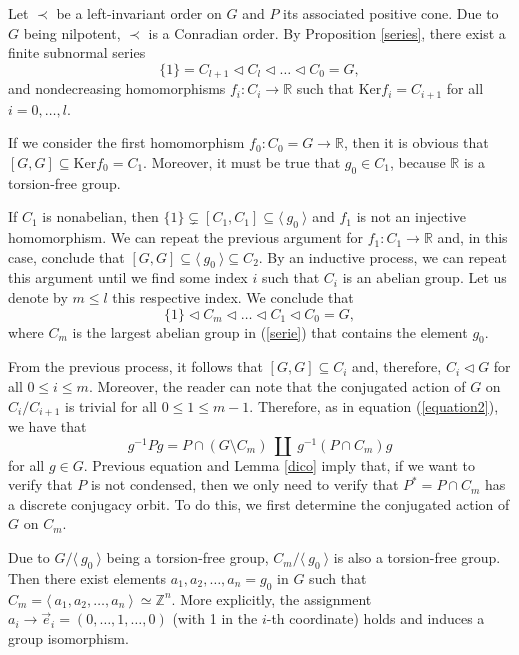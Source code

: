 \documentclass[12pt]{article}
\theoremstyle{definition}
\begin{document}
Let $\prec$ be a left-invariant order on $G$ and $P$ its associated positive cone. Due to $G$ being nilpotent, $\prec$ is a Conradian order. By Proposition \ref{series}, there exist a finite subnormal series
        \begin{equation}
        \label{serie}
        \{1\}=C_{l+1}\vartriangleleft C_l\vartriangleleft \dots \vartriangleleft C_0=G,    
        \end{equation}
and nondecreasing homomorphisms $f_i:C_i\rightarrow \mathbb{R}$ such that Ker$f_i=C_{i+1}$ for all $i=0,\dots,l$. 

If we consider the first homomorphism $f_0:C_0=G\rightarrow \mathbb{R}$, then it is obvious that $[G,G]\subseteq \text{Ker}f_0=C_1$. 
        Moreover, it must be true that $g_0\in C_1$, because $\mathbb{R}$ is a torsion-free group. 
        
        If $C_1$ is nonabelian, then $\{1\}\subsetneq [C_1,C_1]\subseteq \langle\ g_0\ \rangle$ and $f_1$ is not an injective homomorphism. We can repeat the previous argument for $f_1:C_1\rightarrow\mathbb{R}$ and, in this case, conclude that $[G,G]\subseteq \langle\ g_0\ \rangle\subseteq C_2$. 
        By an inductive process, we can repeat this argument until we find some index $i$ such that $C_i$ is an abelian group. Let us denote by $m\leq l$ this respective index. We conclude that
        $$ \{1\}\vartriangleleft C_m\vartriangleleft\dots \vartriangleleft C_1\vartriangleleft C_0=G,$$
        where $C_m$ is the largest abelian group in (\ref{serie}) that contains the element $g_0$.

        From the previous process, it follows that $[G,G]\subseteq C_i$ and, therefore, $C_i\vartriangleleft G$ for all $0\leq i\leq m$.
        Moreover, the reader can note that the conjugated action of $G$ on $C_i/C_{i+1}$ is trivial for all $0\leq 1\leq m-1$. Therefore, as in equation (\ref{equation2}), we have that
        $$g^{-1}Pg=P\cap (G\setminus C_m)\ \amalg\ g^{-1}(P\cap C_m)g$$
        for all $g\in G$. Previous equation and Lemma \ref{dico} imply that, if we want to verify that $P$ is not condensed, then we only need to verify that $P^*=P\cap C_m$ has a discrete conjugacy orbit. 
        To do this, we first determine the conjugated action of $G$ on $C_m$.

        Due to $G/\langle\ g_0\ \rangle$ being a torsion-free group, $C_m/\langle\ g_0\ \rangle$ is also a torsion-free group. Then there exist elements $a_1,a_2,\dots, a_n=g_0$ in $G$ such that $C_m=\langle\ a_1,a_2,\dots, a_n\ \rangle\ \simeq \mathbb{Z}^n$. More explicitly, the assignment $a_i\rightarrow \vec{e}_i=(0,\dots, 1,\dots,0)$ (with 1 in the $i$-th coordinate) holds and induces a group isomorphism. 
\end{document}
